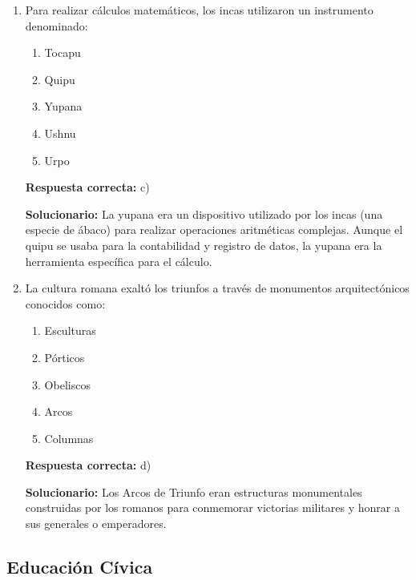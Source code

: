 \begin{enumerate}[resume]

\item Para realizar cálculos matemáticos, los incas utilizaron un instrumento denominado:

\begin{enumerate}[label=\alph*)]
	\item Tocapu
	\item Quipu
	\item Yupana
	\item Ushnu
	\item Urpo
\end{enumerate}

\textbf{Respuesta correcta:} c)

\vspace{2mm}
\textbf{Solucionario:}
La yupana era un dispositivo utilizado por los incas (una especie de ábaco) para realizar operaciones aritméticas complejas. Aunque el quipu se usaba para la contabilidad y registro de datos, la yupana era la herramienta específica para el cálculo.

\vspace{6mm}

\item La cultura romana exaltó los triunfos a través de monumentos arquitectónicos conocidos como:

\begin{enumerate}[label=\alph*)]
	\item Esculturas
	\item Pórticos
	\item Obeliscos
	\item Arcos
	\item Columnas
\end{enumerate}

\textbf{Respuesta correcta:} d)

\vspace{2mm}
\textbf{Solucionario:}
Los Arcos de Triunfo eran estructuras monumentales construidas por los romanos para conmemorar victorias militares y honrar a sus generales o emperadores.



	\vspace{6mm}

\end{enumerate}


\subsection*{Educación Cívica}

